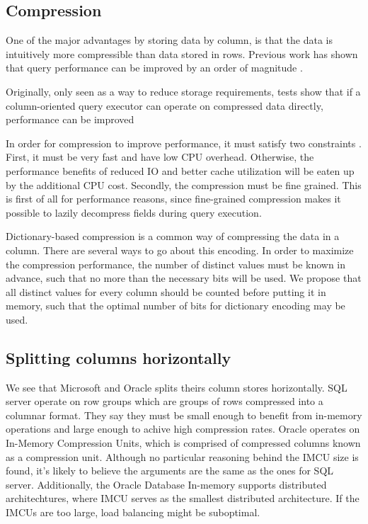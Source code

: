 \subsection{Compression}
\label{sub:Compression}
One of the major advantages by storing data by column, is that the data is intuitively more compressible than data stored in rows. Previous work has shown that query performance can be improved by an order of magnitude \cite{Abadi2006-bf}.

Originally, only seen as a way to reduce storage requirements, tests show that if a column-oriented query executor can operate on compressed data directly, performance can be improved \cite{Abadi2008-dd}

In order for compression to improve performance, it must satisfy two constraints \cite{Westmann2000-mz}. First, it must be very fast and have low CPU overhead. Otherwise, the performance benefits of reduced IO and better cache utilization will be eaten up by the additional CPU cost. Secondly, the compression must be fine grained. This is first of all for performance reasons, since fine-grained compression makes it possible to lazily decompress fields during query execution.

Dictionary-based compression is a common way of compressing the data in a column. There are several ways to go about this encoding. In order to maximize the compression performance, the number of distinct values must be known in advance, such that no more than the necessary bits will be used. We propose that all distinct values for every column should be counted before putting it in memory, such that the optimal number of bits for dictionary encoding may be used.

\subsection{Splitting columns horizontally}
\label{sub:Splitting columns horizontally}
We see that Microsoft and Oracle splits theirs column stores horizontally. SQL server operate on row groups which are groups of rows compressed into a columnar format. They say they must be small enough to benefit from in-memory operations and large enough to achive high compression rates. Oracle operates on In-Memory Compression Units, which is comprised of compressed columns known as a compression unit. Although no particular reasoning behind the IMCU size is found, it's likely to believe the arguments are the same as the ones for SQL server. Additionally, the Oracle Database In-memory supports distributed architechtures, where IMCU serves as the smallest distributed architecture. If the IMCUs are too large, load balancing might be suboptimal.

